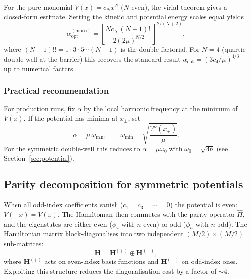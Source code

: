 For the pure monomial $V(x)=c_N x^N$ ($N$ even), the virial theorem gives
a closed-form estimate.  Setting the kinetic and potential energy scales
equal yields
\begin{equation}\label{eq:opt_alpha_mono}
  \alpha_{\mathrm{opt}}^{(\mathrm{mono})}
  = \left[\frac{N c_N\,(N-1)!!}{2\left(2\mu\right)^{N/2}}\right]^{2/(N+2)},
\end{equation}
where $(N-1)!! = 1\cdot 3\cdot 5\cdots(N-1)$ is the double factorial.
For $N=4$ (quartic double-well at the barrier) this recovers the standard
result $\alpha_{\mathrm{opt}}=(3c_4/\mu)^{1/3}$ up to numerical factors.

\subsubsection{Practical recommendation}

For production runs, fix $\alpha$ by the local harmonic frequency at the
minimum of $V(x)$.  If the potential has minima at $x_{\pm}$, set
\begin{equation}\label{eq:alpha_harm}
  \alpha = \mu\,\omega_{\min},
  \qquad
  \omega_{\min} = \sqrt{\frac{V''(x_+)}{\mu}}.
\end{equation}
For the symmetric double-well this reduces to $\alpha=\mu\omega_0$ with
$\omega_0 = \sqrt{4b}$ (see Section~\ref{sec:potential}).

\subsection{Parity decomposition for symmetric potentials}\label{sec:parity_gen}

When all odd-index coefficients vanish ($c_1=c_3=\cdots=0$) the potential is
even: $V(-x)=V(x)$.  The Hamiltonian then commutes with the parity operator
$\hat\Pi$, and the eigenstates are either even ($\phi_n$ with $n$ even) or
odd ($\phi_n$ with $n$ odd).  The Hamiltonian matrix block-diagonalises into
two independent $(M/2)\times(M/2)$ sub-matrices:
\begin{equation}
  \mathbf{H}
  = \mathbf{H}^{(+)} \oplus \mathbf{H}^{(-)},
\end{equation}
where $\mathbf{H}^{(+)}$ acts on even-index basis functions and
$\mathbf{H}^{(-)}$ on odd-index ones.  Exploiting this structure reduces the
diagonalisation cost by a factor of $\sim 4$.

